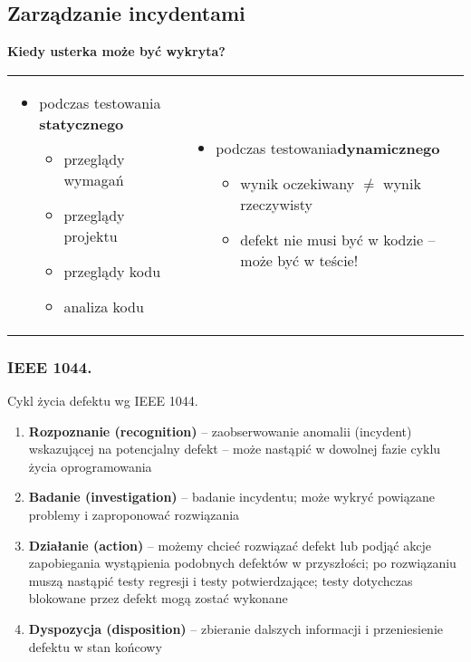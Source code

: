 \documentclass[../main.tex]{subfiles}
\begin{document}
    \subsection{Zarządzanie incydentami}
    \textbf{Kiedy usterka może być wykryta?}
    \begin{table}[H]
        \begin{center}
            \begin{tabular}{p{8cm} p{8cm}}
                \begin{itemize}
                    \item podczas testowania \textbf{statycznego}
                    \begin{itemize}
                        \item przeglądy wymagań
                        \item przeglądy projektu
                        \item przeglądy kodu
                        \item analiza kodu
                    \end{itemize}
                \end{itemize}
                &
                \begin{itemize}
                    \item podczas testowania\textbf{dynamicznego}
                    \begin{itemize}
                        \item wynik oczekiwany $\neq$ wynik rzeczywisty
                        \item defekt nie musi być w kodzie – może być w teście!
                    \end{itemize}
                \end{itemize}
            \end{tabular}
        \end{center}
    \end{table}

    \subsubsection{IEEE 1044.}
    Cykl życia defektu wg IEEE 1044.
    \begin{enumerate}
        \item \textbf{Rozpoznanie (recognition)} – zaobserwowanie anomalii (incydent) wskazującej na potencjalny defekt – może nastąpić w dowolnej fazie cyklu życia oprogramowania
        \item \textbf{Badanie (investigation)} – badanie incydentu; może wykryć powiązane problemy i zaproponować rozwiązania
        \item \textbf{Działanie (action)} – możemy chcieć rozwiązać defekt lub podjąć akcje zapobiegania wystąpienia podobnych defektów w przyszłości; po rozwiązaniu muszą nastąpić testy regresji i testy potwierdzające; testy dotychczas blokowane przez defekt mogą zostać wykonane
        \item \textbf{Dyspozycja (disposition)} – zbieranie dalszych informacji i przeniesienie defektu w stan końcowy
    \end{enumerate}
\end{document}
